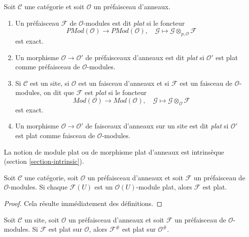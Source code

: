 \begin{definition}

\label{definition-flat}

Soit $\mathcal{C}$ une catégorie et soit $\mathcal{O}$ un préfaisceau d'anneaux.

\begin{enumerate}

\item Un préfaisceau $\mathcal{F}$ de $\mathcal{O}$-modules est dit
{\it plat} si le foncteur
$$
\textit{PMod}(\mathcal{O})
\longrightarrow
\textit{PMod}(\mathcal{O}), \quad
\mathcal{G} \mapsto \mathcal{G} \otimes_{p, \mathcal{O}} \mathcal{F}
$$
est exact.
\item Un morphisme $\mathcal{O} \to \mathcal{O}'$ de préfaisceaux d'anneaux
est dit {\it plat} si $\mathcal{O}'$ est plat comme préfaisceau de
$\mathcal{O}$-modules.
\item Si $\mathcal{C}$ est un site, si $\mathcal{O}$ est un faisceau
d'anneaux et si $\mathcal{F}$ est un faisceau de $\mathcal{O}$-modules,
on dit que $\mathcal{F}$ est {\it plat} si le foncteur
$$
\textit{Mod}(\mathcal{O})
\longrightarrow
\textit{Mod}(\mathcal{O}), \quad
\mathcal{G} \mapsto \mathcal{G} \otimes_\mathcal{O} \mathcal{F}
$$
est exact.
\item Un morphisme $\mathcal{O} \to \mathcal{O}'$ de faisceaux d'anneaux
sur un site est dit {\it plat} si $\mathcal{O}'$ est plat comme faisceau de
$\mathcal{O}$-modules.

\end{enumerate}

\end{definition}

\noindent
La notion de module plat ou de morphisme plat d'anneaux est intrinsèque
(section \ref{section-intrinsic}).

\begin{lemma}

\label{lemma-flatness-presheaves}
Soit $\mathcal{C}$ une catégorie, soit $\mathcal{O}$ un préfaisceau
d'anneaux et soit $\mathcal{F}$ un préfaisceau de $\mathcal{O}$-modules.
Si chaque $\mathcal{F}(U)$ est un $\mathcal{O}(U)$-module plat,
alors $\mathcal{F}$ est plat.
\end{lemma}

\begin{proof}
Cela résulte immédiatement des définitions.
\end{proof}

\begin{lemma}

\label{lemma-flatness-sheafification}
Soit $\mathcal{C}$ un site, soit $\mathcal{O}$ un préfaisceau d'anneaux
et soit $\mathcal{F}$ un préfaisceau de $\mathcal{O}$-modules.
Si $\mathcal{F}$ est plat sur $\mathcal{O}$, alors $\mathcal{F}^\#$
est plat sur $\mathcal{O}^\#$.
\end{lemma}

